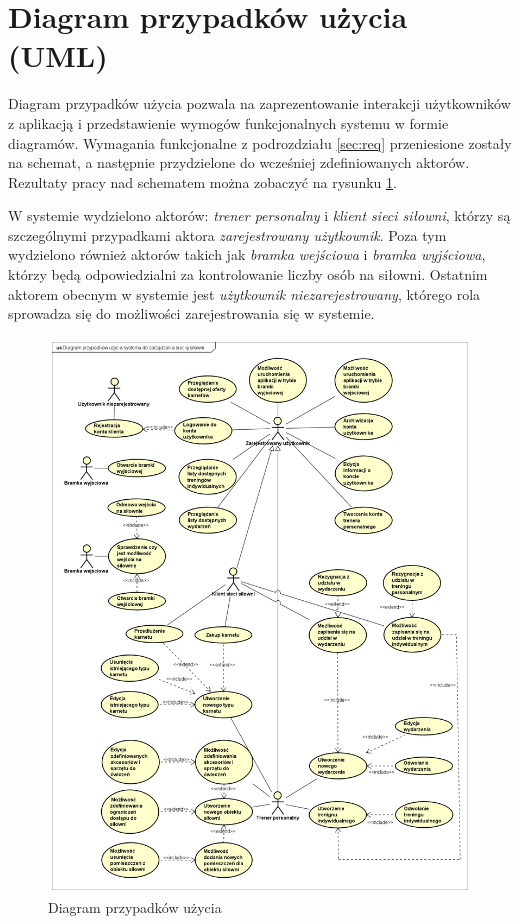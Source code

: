 \documentclass[a4paper,twoside,12pt]{book}
\begin{document}
{	\section {Diagram przypadków użycia (UML)}
	Diagram przypadków użycia pozwala na zaprezentowanie interakcji użytkowników z aplikacją i przedstawienie wymogów funkcjonalnych systemu w formie diagramów. Wymagania funkcjonalne z podrozdziału \ref{sec:req} przeniesione zostały na schemat, a następnie przydzielone do wcześniej zdefiniowanych aktorów. Rezultaty pracy nad schematem można zobaczyć na rysunku \ref{fig:diagramPrzpydakowUzyciaUML}.
	
	W systemie wydzielono aktorów: \textit{trener personalny} i \textit{klient sieci siłowni}, którzy są szczególnymi przypadkami aktora \textit{zarejestrowany użytkownik}. Poza tym wydzielono również aktorów takich jak \textit{bramka wejściowa} i \textit{bramka wyjściowa}, którzy będą odpowiedzialni za kontrolowanie liczby osób na siłowni. Ostatnim aktorem obecnym w systemie jest \textit{użytkownik niezarejestrowany}, którego rola sprowadza się do możliwości zarejestrowania się w systemie.
	
\begin{figure}[htbp]
	\includegraphics[width=1\linewidth, keepaspectratio]{diagram_przypadków_użycia_xs.png}
	\caption{Diagram przypadków użycia}
	\label{fig:diagramPrzpydakowUzyciaUML}
\end{figure}
	
}
\end{document}
